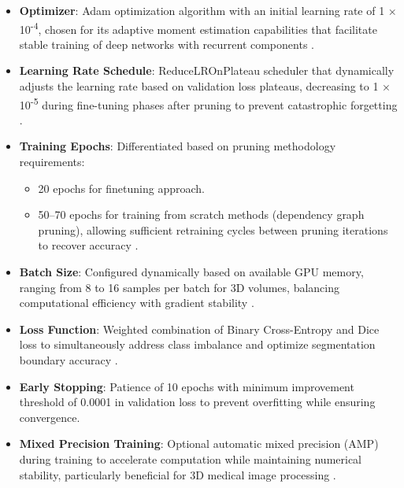 \documentclass[12pt,a4paper]{article}
\begin{document}
\begin{enumerate}
\begin{itemize}
    \item \textbf{Optimizer}: Adam optimization algorithm with an initial learning rate of 1 × 10\textsuperscript{-4}, chosen for its adaptive moment estimation capabilities that facilitate stable training of deep networks with recurrent components \cite{Loshchilov2017}.
    
    \item \textbf{Learning Rate Schedule}: ReduceLROnPlateau scheduler that dynamically adjusts the learning rate based on validation loss plateaus, decreasing to 1 × 10\textsuperscript{-5} during fine-tuning phases after pruning to prevent catastrophic forgetting \cite{Xin2020}.
    
    \item \textbf{Training Epochs}: Differentiated based on pruning methodology requirements:
    \begin{itemize}
        \item 20 epochs for finetuning approach.
        \item 50--70 epochs for training from scratch methods (dependency graph pruning), allowing sufficient retraining cycles between pruning iterations to recover accuracy \cite{Wu2023, Frankle2018}.
    \end{itemize}
    
    \item \textbf{Batch Size}: Configured dynamically based on available GPU memory, ranging from 8 to 16 samples per batch for 3D volumes, balancing computational efficiency with gradient stability \cite{Masters2018}.
    
    \item \textbf{Loss Function}: Weighted combination of Binary Cross-Entropy and Dice loss to simultaneously address class imbalance and optimize segmentation boundary accuracy \cite{Sudre2017}.
    
    \item \textbf{Early Stopping}: Patience of 10 epochs with minimum improvement threshold of 0.0001 in validation loss to prevent overfitting while ensuring convergence.
    
    \item \textbf{Mixed Precision Training}: Optional automatic mixed precision (AMP) during training to accelerate computation while maintaining numerical stability, particularly beneficial for 3D medical image processing \cite{Micikevicius2018}.
\end{itemize}


\end{enumerate}
\end{document}

